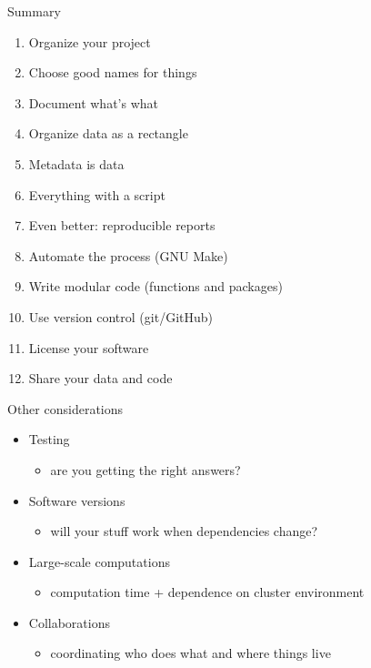 \documentclass[aspectratio=169,12pt,t]{beamer}
\begin{document}
\begin{frame}[c]{Summary}

  \begin{enumerate}
  \item Organize your project
  \item Choose good names for things
  \item Document what's what
  \item Organize data as a rectangle
  \item Metadata is data
  \item Everything with a script
  \item Even better: reproducible reports
  \item Automate the process {\lolit (GNU Make)}
  \item Write modular code {\lolit (functions and packages)}
  \item Use version control {\lolit (git/GitHub)}
  \item License your software
  \item Share your data and code
  \end{enumerate}


\end{frame}


\begin{frame}[c]{Other considerations}

  \begin{itemize}
    \itemsep12pt
  \item Testing
    \begin{itemize}
    \item[] {\lolit are you getting the right answers?}
    \end{itemize}
  \item Software versions
    \begin{itemize}
    \item[] {\lolit will your stuff work when dependencies change?}
    \end{itemize}
  \item Large-scale computations
    \begin{itemize}
    \item[] {\lolit computation time + dependence on cluster environment}
    \end{itemize}
  \item Collaborations
    \begin{itemize}
    \item[] {\lolit coordinating who does what and where things live}
    \end{itemize}
  \end{itemize}


\end{frame}
\end{document}
